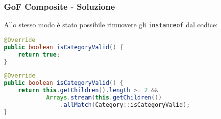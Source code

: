 \begin{frame}[fragile]
    \frametitle{GoF Composite - Soluzione}

    Allo stesso modo è stato possibile rimuovere gli \texttt{instanceof} dal codice:

    \lstset{style=java}
    \begin{lstlisting}[language=java, caption={Post refactor, in LeafCategory}]
@Override
public boolean isCategoryValid() {
    return true;
}\end{lstlisting}

    \lstset{style=java}
    \begin{lstlisting}[language=java, caption={Post refactor, in NodeCategory}]
@Override
public boolean isCategoryValid() {
    return this.getChildren().length >= 2 &&
            Arrays.stream(this.getChildren())
                .allMatch(Category::isCategoryValid);
}\end{lstlisting}

\end{frame}